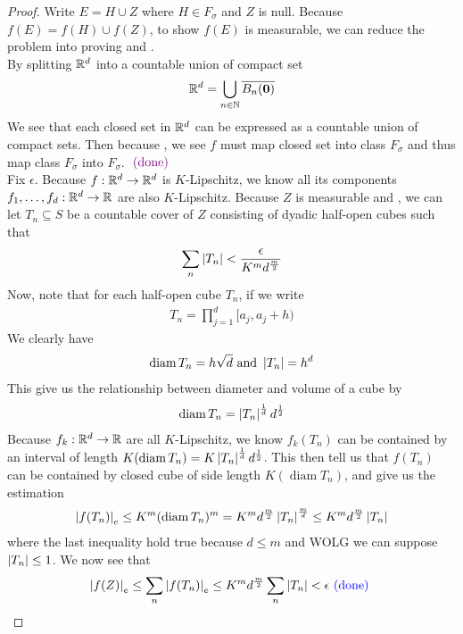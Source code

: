 \documentclass{report}
\begin{document}
\begin{proof}
  Write $E=H\cup Z$ where $H\in F_\sigma$ and $Z$ is null. Because $f(E)=f(H)\cup f(Z)$, to show $f(E)$ is measurable, we can reduce the problem into proving  and .\\

By splitting $\mathbb{R}^d$ into a countable union of compact set 
 \begin{align*}
\mathbb{R}^d = \bigcup_{n\in\mathbb{N}} \overline{B_n (\textbf{0})}
\end{align*}
We see that each closed set in $\mathbb{R}^d$ can be expressed as a countable union of compact sets. Then because , we see $f$ must map closed set into class $F_\sigma$ and thus map class $F_\sigma$ into $F_\sigma$. $\textcolor{violet}{\text{ (done) }}$\\

Fix $\epsilon $. Because $f:\mathbb{R}^d\rightarrow \mathbb{R}^d$ is $K$-Lipschitz, we know all its components  $f_1,\dots ,f_d:\mathbb{R}^d \rightarrow \mathbb{R}$  are also $K$-Lipschitz. Because $Z$ is measurable and , we can let $T_n \subseteq S$ be a countable cover of $Z$ consisting of dyadic half-open cubes such that 
\begin{align*}
\sum_n \left|T_n\right|<  \frac{\epsilon }{ K^m d^{\frac{m}{2}}}
\end{align*}
Now, note that for each half-open cube $T_n$, if we write 
\begin{align*}
T_n=\prod_{j=1}^d [a_j,a_j+h)
\end{align*}
We clearly have 
\begin{align*}
\operatorname{diam}T_n= h \sqrt{d} \text{ and }\left|T_n\right|=h^d
\end{align*}
This give us the relationship between diameter and volume of a cube by 
\begin{align*}
\operatorname{diam}T_n=  \left|T_n\right|^{\frac{1}{d}}d^{\frac{1}{2}}
\end{align*}
Because $f_k:\mathbb{R}^d \rightarrow \mathbb{R}$ are all $K$-Lipschitz, we know $f_k(T_n)$ can be contained by an interval of length $K(\operatorname{diam}T_n)=K\left|T_n\right|^{\frac{1}{d}}d^{\frac{1}{2}}$. This then tell us that $f(T_n)$ can be contained by closed cube of side length $K(\operatorname{diam}T_n)$, and give us the estimation  
\begin{align*}
\left|f(T_n)\right|_e\leq K^m(\operatorname{diam}T_n)^m= K^m d^{\frac{m}{2}} \left|T_n\right|^{\frac{m}{d}}\leq K^md^{\frac{m}{2}}\left|T_n\right|
\end{align*}
where the last inequality hold true because $d\leq m$ and WOLG we can suppose $\left|T_n\right|\leq 1$. We now see that 
\begin{align*}
\left|f(Z)\right|_e \leq \sum_n \left|f(T_n)\right|_e \leq K^md^{\frac{m}{2}}\sum_n \left|T_n\right|< \epsilon \textcolor{blue}{\text{ (done) }}
\end{align*}
\end{proof}
\end{document}
